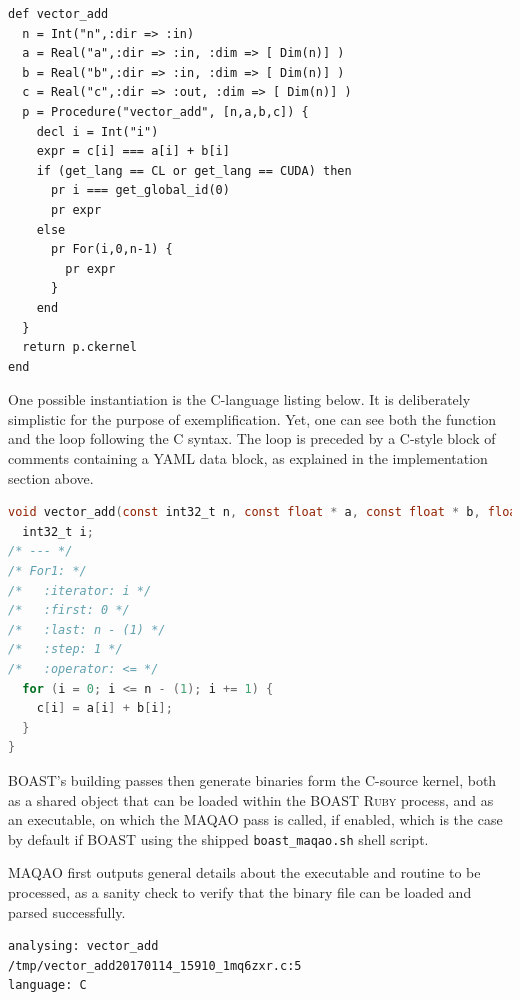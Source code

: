 \documentclass[11pt, a4paper, twoside]{montblanc2}
\def\ruby{\textsc{Ruby}\xspace}
\begin{document}
\begin{lstlisting}[style=BOAST]
def vector_add
  n = Int("n",:dir => :in)
  a = Real("a",:dir => :in, :dim => [ Dim(n)] )
  b = Real("b",:dir => :in, :dim => [ Dim(n)] )
  c = Real("c",:dir => :out, :dim => [ Dim(n)] )
  p = Procedure("vector_add", [n,a,b,c]) {
    decl i = Int("i")
    expr = c[i] === a[i] + b[i]
    if (get_lang == CL or get_lang == CUDA) then
      pr i === get_global_id(0)
      pr expr
    else
      pr For(i,0,n-1) {
        pr expr
      }
    end
  }
  return p.ckernel
end
\end{lstlisting}

One possible instantiation is the C-language listing below. It is deliberately 
simplistic for the purpose of exemplification. Yet, one can see both the 
function and the loop following the C syntax. The loop is preceded by a C-style 
block of comments containing a YAML data block, as explained in the 
implementation section above. 

\begin{lstlisting}[language=C]
void vector_add(const int32_t n, const float * a, const float * b, float * c){
  int32_t i;
/* --- */
/* For1: */
/*   :iterator: i */
/*   :first: 0 */
/*   :last: n - (1) */
/*   :step: 1 */
/*   :operator: <= */
  for (i = 0; i <= n - (1); i += 1) {
    c[i] = a[i] + b[i];
  }
}
\end{lstlisting}

BOAST's building passes then generate binaries form the C-source kernel, both as 
a shared object that can be loaded within the BOAST \ruby process, and as an 
executable, on which the MAQAO pass is called, if enabled, which is the case by 
default if BOAST using the shipped \verb|boast_maqao.sh| shell script.

MAQAO first outputs general details about the executable and routine to be 
processed, as a sanity check to verify that the binary file can be loaded and 
parsed successfully.

\begin{verbatim}
analysing: vector_add
/tmp/vector_add20170114_15910_1mq6zxr.c:5
language: C
\end{verbatim}
\end{document}
